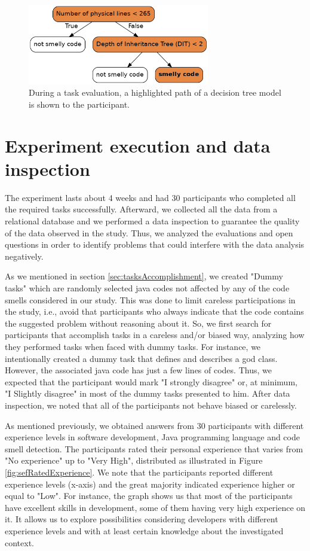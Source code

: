 \begin{figure}[H]
\centering
\includegraphics[width=300px]{figures/highlightedTree.png}
\caption{During a task evaluation, a highlighted path of a decision tree model is shown to the participant.}
\label{fig:highlightedDT}
\end{figure}
    
\section{Experiment execution and data inspection}

The experiment lasts about 4 weeks and had 30 participants who completed all the required tasks successfully. Afterward, we collected all the data from a relational database and we performed a data inspection to guarantee the quality of the data observed in the study. Thus, we analyzed the evaluations and open questions in order to identify problems that could interfere with the data analysis negatively.

As we mentioned in section \ref{sec:tasksAccomplishment}, we created "Dummy tasks" which are randomly selected java codes not affected by any of the code smells considered in our study. This was done to limit careless participations \cite{palomba2014they} in the study, i.e., avoid that participants who always indicate that the code contains the suggested problem without reasoning about it. So, we first search for participants that accomplish tasks in a careless and/or biased way, analyzing how they performed tasks when faced with dummy tasks. For instance, we intentionally created a dummy task that defines and describes a god class. However, the associated java code has just a few lines of codes. Thus, we expected that the participant would mark "I strongly disagree" or, at minimum, "I Slightly disagree" in most of the dummy tasks presented to him. After data inspection, we noted that all of the participants not behave biased or carelessly. 

As mentioned previously, we obtained answers from 30 participants with different experience levels in software development, Java programming language and code smell detection. The participants rated their personal experience that varies from "No experience" up to "Very High", distributed as illustrated in Figure \ref{fig:sefRatedExperience}. We note that the participants reported different experience levels (x-axis) and the great majority indicated experience higher or equal to "Low". For instance, the graph shows us that most of the participants have excellent skills in development, some of them having very high experience on it. It allows us to explore possibilities considering developers with different experience levels and with at least certain knowledge about the investigated context.

